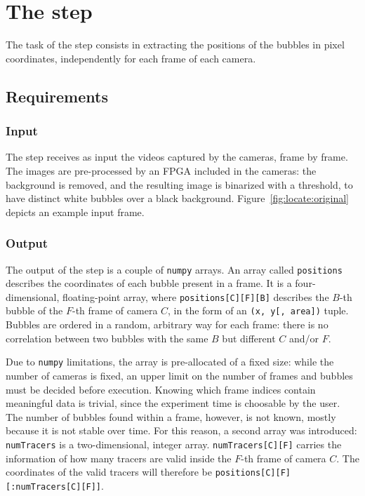 \chapter{The \locate* step}
\label{chap:locate}

\newcommand{\locateimgsize}{0.9\textwidth}

The task of the \locate* step consists in extracting the positions of the bubbles in pixel coordinates, independently for each frame of each camera.

\section{Requirements}

\subsection{Input}
The \locate* step receives as input the videos captured by the cameras, frame by frame.
The images are pre-processed by an FPGA included in the cameras: the background is removed, and the resulting image is binarized with a threshold, to have distinct white bubbles over a black background.
Figure~\ref{fig:locate:original} depicts an example input frame.

\subsection{Output}
\label{sec:locate:output}

The output of the \locate* step is a couple of \texttt{numpy} arrays.
An array called \texttt{positions} describes the coordinates of each bubble present in a frame.
It is a four-dimensional, floating-point array, where \texttt{positions[C][F][B]} describes the $B$-th bubble of the $F$-th frame of camera $C$, in the form of an \texttt{(x, y[, area])} tuple.
Bubbles are ordered in a random, arbitrary way for each frame: there is no correlation between two bubbles with the same $B$ but different $C$ and/or $F$.

Due to \texttt{numpy} limitations, the array is pre-allocated of a fixed size: while the number of cameras is fixed, an upper limit on the number of frames and bubbles must be decided before execution.
Knowing which frame indices contain meaningful data is trivial, since the experiment time is choosable by the user.
The number of bubbles found within a frame, however, is not known, mostly because it is not stable over time.
For this reason, a second array was introduced: \texttt{numTracers} is a two-dimensional, integer array.
\texttt{numTracers[C][F]} carries the information of how many tracers are valid inside the $F$-th frame of camera $C$.
The coordinates of the valid tracers will therefore be \texttt{positions[C][F][:numTracers[C][F]]}.

